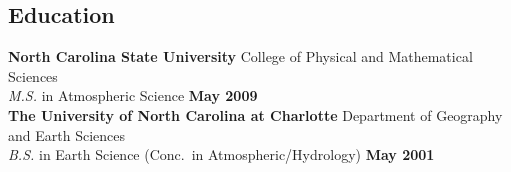 \documentclass[margin,line]{resume}
\begin{document}
\begin{resume}
\section{\mysidestyle Education}

\textbf{North Carolina State University} College of Physical and Mathematical Sciences\\
\textsl{M.S.} in Atmospheric Science \hfill \textbf{May 2009}\vspace{3mm}\\
\textbf{The University of North Carolina at Charlotte} Department of Geography and Earth Sciences\\
\textsl{B.S.} in Earth Science (Conc.\ in Atmospheric/Hydrology) \hfill \textbf{May 2001}












\end{resume}
\end{document}
